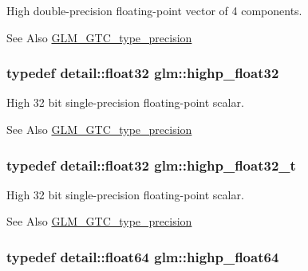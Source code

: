 High double-\/precision floating-\/point vector of 4 components. \begin{DoxySeeAlso}{See Also}
\hyperlink{group__gtc__type__precision}{G\-L\-M\-\_\-\-G\-T\-C\-\_\-type\-\_\-precision} 
\end{DoxySeeAlso}
\hypertarget{group__gtc__type__precision_ga91af7513c1102410646f2c435ca29be5}{
\subsubsection[{highp\-\_\-float32}]{\setlength{\rightskip}{0pt plus 5cm}typedef detail\-::float32 {\bf glm\-::highp\-\_\-float32}}}\label{group__gtc__type__precision_ga91af7513c1102410646f2c435ca29be5}
High 32 bit single-\/precision floating-\/point scalar. \begin{DoxySeeAlso}{See Also}
\hyperlink{group__gtc__type__precision}{G\-L\-M\-\_\-\-G\-T\-C\-\_\-type\-\_\-precision} 
\end{DoxySeeAlso}
\hypertarget{group__gtc__type__precision_ga4e16a7818d09e2da3b81765999f23928}{
\subsubsection[{highp\-\_\-float32\-\_\-t}]{\setlength{\rightskip}{0pt plus 5cm}typedef detail\-::float32 {\bf glm\-::highp\-\_\-float32\-\_\-t}}}\label{group__gtc__type__precision_ga4e16a7818d09e2da3b81765999f23928}
High 32 bit single-\/precision floating-\/point scalar. \begin{DoxySeeAlso}{See Also}
\hyperlink{group__gtc__type__precision}{G\-L\-M\-\_\-\-G\-T\-C\-\_\-type\-\_\-precision} 
\end{DoxySeeAlso}
\hypertarget{group__gtc__type__precision_gab871a78c548d2fa53e1e8ec64a46eee7}{
\subsubsection[{highp\-\_\-float64}]{\setlength{\rightskip}{0pt plus 5cm}typedef detail\-::float64 {\bf glm\-::highp\-\_\-float64}}}\label{group__gtc__type__precision_gab871a78c548d2fa53e1e8ec64a46eee7}
